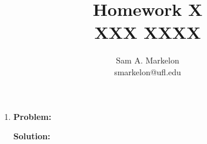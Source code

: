 \documentclass[12pt]{article}
\begin{document}
\title{Homework X \\
\small{XXX XXXX}}
\author{Sam A. Markelon\\ 
smarkelon@ufl.edu} 

\maketitle

\begin{enumerate}

	\item 

	\textbf{Problem: }

	\textbf{Solution: }


\end{enumerate}
\end{document}
